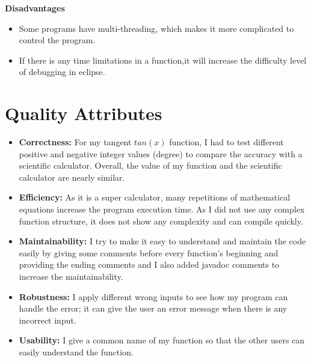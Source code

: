\documentclass[letterpaper, 11pt]{report}
\begin{document}
\textbf{Disadvantages}
\begin{itemize}
\item Some programs have multi-threading, which makes it more complicated to control the program.
\item If there is any time limitations in a function,it will increase the difficulty level of debugging in eclipse.
\end{itemize}
\newpage
\section*{Quality Attributes}
\begin{itemize}
  \item \textbf{Correctness:} For my tangent $tan(x)$ function, I had to test different positive and negative integer values (degree) to compare the accuracy with a scientific calculator. Overall, the value of my function and the scientific calculator are nearly similar.
  \item \textbf{Efficiency:} As it is a super calculator, many repetitions of mathematical equations increase the program execution time. As I did not use any complex function structure, it does not show any complexity and can compile quickly.
  \item \textbf{Maintainability:} I try to make it easy to understand and maintain the code easily by giving some comments before every function's beginning and providing the ending comments and I also added javadoc comments to increase the maintainability. 
  \item \textbf{Robustness:} I apply different wrong inputs to see how my program can handle the error; it can give the user an error message when there is any incorrect input.
  \item \textbf{Usability:} I give a common name of my function so that the other users can easily understand the function. 
  \end{itemize}
  
\end{document}
